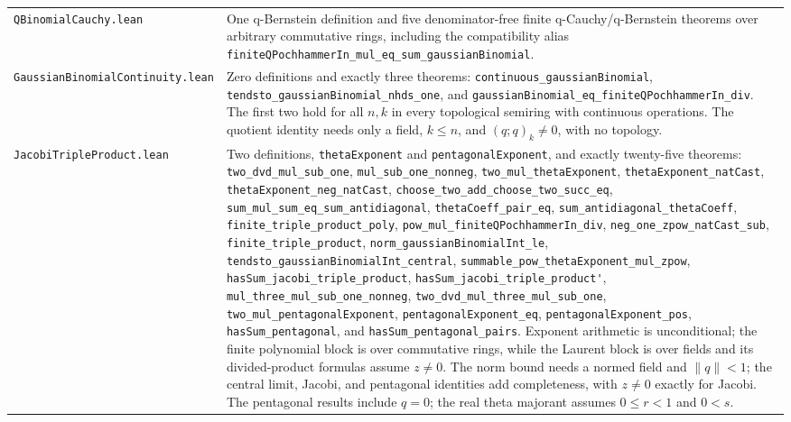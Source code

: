 \documentclass[11pt,oneside]{article}
\theoremstyle{definition}
\theoremstyle{remark}
\begin{document}
\begin{longtable}{>{\raggedright\arraybackslash}p{} >{\raggedright\arraybackslash}p{}}
\nolinkurl{QBinomialCauchy.lean} & One q-Bernstein definition and five denominator-free finite q-Cauchy/q-Bernstein theorems over arbitrary commutative rings, including the compatibility alias \nolinkurl{finiteQPochhammerIn_mul_eq_sum_gaussianBinomial}. \\
\nolinkurl{GaussianBinomialContinuity.lean} & Zero definitions and exactly three theorems: \nolinkurl{continuous_gaussianBinomial}, \nolinkurl{tendsto_gaussianBinomial_nhds_one}, and \nolinkurl{gaussianBinomial_eq_finiteQPochhammerIn_div}.  The first two hold for all \(n,k\) in every topological semiring with continuous operations.  The quotient identity needs only a field, \(k\le n\), and \((q;q)_k\ne0\), with no topology. \\
\nolinkurl{JacobiTripleProduct.lean} & Two definitions, \nolinkurl{thetaExponent} and \nolinkurl{pentagonalExponent}, and exactly twenty-five theorems: \nolinkurl{two_dvd_mul_sub_one}, \nolinkurl{mul_sub_one_nonneg}, \nolinkurl{two_mul_thetaExponent}, \nolinkurl{thetaExponent_natCast}, \nolinkurl{thetaExponent_neg_natCast}, \nolinkurl{choose_two_add_choose_two_succ_eq}, \nolinkurl{sum_mul_sum_eq_sum_antidiagonal}, \nolinkurl{thetaCoeff_pair_eq}, \nolinkurl{sum_antidiagonal_thetaCoeff}, \nolinkurl{finite_triple_product_poly}, \nolinkurl{pow_mul_finiteQPochhammerIn_div}, \nolinkurl{neg_one_zpow_natCast_sub}, \nolinkurl{finite_triple_product}, \nolinkurl{norm_gaussianBinomialInt_le}, \nolinkurl{tendsto_gaussianBinomialInt_central}, \nolinkurl{summable_pow_thetaExponent_mul_zpow}, \nolinkurl{hasSum_jacobi_triple_product}, \nolinkurl{hasSum_jacobi_triple_product'}, \nolinkurl{mul_three_mul_sub_one_nonneg}, \nolinkurl{two_dvd_mul_three_mul_sub_one}, \nolinkurl{two_mul_pentagonalExponent}, \nolinkurl{pentagonalExponent_eq}, \nolinkurl{pentagonalExponent_pos}, \nolinkurl{hasSum_pentagonal}, and \nolinkurl{hasSum_pentagonal_pairs}.  Exponent arithmetic is unconditional; the finite polynomial block is over commutative rings, while the Laurent block is over fields and its divided-product formulas assume \(z\ne0\).  The norm bound needs a normed field and \(\lVert q\rVert<1\); the central limit, Jacobi, and pentagonal identities add completeness, with \(z\ne0\) exactly for Jacobi.  The pentagonal results include \(q=0\); the real theta majorant assumes \(0\le r<1\) and \(0<s\). \\

\end{longtable}
\end{document}
